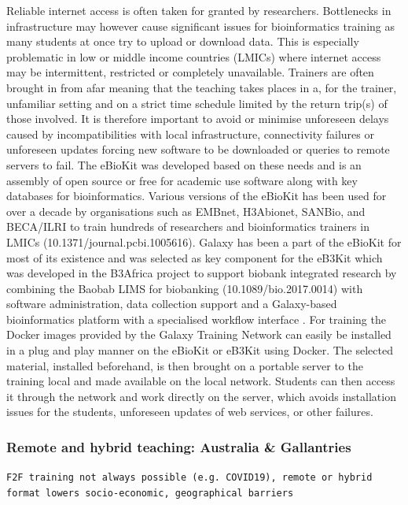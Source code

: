 \documentclass[10pt,letterpaper]{article}
\begin{document}
Reliable internet access is often taken for granted by researchers.
Bottlenecks in infrastructure may however cause significant issues for bioinformatics training as many students at once try to upload or download data.
This is especially problematic in low or middle income countries (LMICs) where internet access may be intermittent, restricted or completely unavailable.
Trainers are often brought in from afar meaning that the teaching takes places in a, for the trainer, unfamiliar setting and on a strict time schedule limited by the return trip(s) of those involved.
It is therefore important to avoid or minimise unforeseen delays caused by incompatibilities with local infrastructure, connectivity failures or unforeseen updates forcing new software to be downloaded or queries to remote servers to fail.
The eBioKit was developed based on these needs and is an assembly of open source or free for academic use software along with key databases for bioinformatics.
Various versions of the eBioKit has been used for over a decade by organisations such as EMBnet, H3Abionet, SANBio, and BECA/ILRI to train hundreds of researchers and bioinformatics trainers in LMICs (10.1371/journal.pcbi.1005616).
Galaxy has been a part of the eBioKit for most of its existence and was selected as key component for the eB3Kit which was developed in the B3Africa project \cite{Klingstrom_2016} to support biobank integrated research by combining the Baobab LIMS for biobanking (10.1089/bio.2017.0014) with software administration, data collection support and a Galaxy-based bioinformatics platform with a specialised workflow interface \cite{Klingstrom_2017}.
For training the Docker images provided by the Galaxy Training Network can easily be installed in a plug and play manner on the eBioKit or eB3Kit using Docker.
The selected material, installed beforehand, is then brought on a portable server to the training local and made available on the local network.
Students can then access it through the network and work directly on the server, which avoids installation issues for the students, unforeseen updates of web services, or other failures.


\subsubsection*{Remote and hybrid teaching: Australia \& Gallantries}

\verb+F2F training not always possible (e.g. COVID19), remote or hybrid format lowers socio-economic, geographical barriers+
\end{document}
